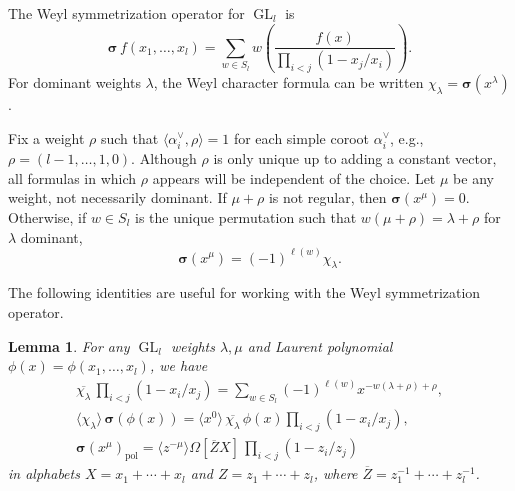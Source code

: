 \documentclass[12pt]{amsart}
\newtheorem{lemma}[thm]{Lemma}
\theoremstyle{definition}
\theoremstyle{remark}
\newcommand{\sigmabold}{{\boldsymbol \sigma }}
\DeclareMathOperator{\pol}{pol}
\DeclareMathOperator{\GL}{GL}
\newcommand{\chek}{^{\vee }}
\begin{document}
The Weyl symmetrization operator for $\GL _{l}$ is
\begin{equation}\label{e:Weyl-symmetrization}
\sigmabold \, f(x_{1},\ldots,x_{l}) = \sum _{w\in S_{l}}
w\left(\frac{f(x)}{\prod _{i<j}(1-x_{j}/x_{i})} \right).
\end{equation}
For dominant weights $\lambda$,
the Weyl character formula can be written $\chi _{\lambda } = \sigmabold
(x^{\lambda })$.

Fix a weight $\rho$ such that $\langle \alpha _{i}\chek ,\rho \rangle
= 1$ for each simple coroot $\alpha _{i}\chek $, e.g., $\rho =
(l-1,\ldots,1,0)$.  Although $\rho $ is only unique up to adding a
constant vector, all formulas in which $\rho $ appears will be
independent of the choice.  Let $\mu $ be any weight, not necessarily
dominant.  If $\mu +\rho $ is not regular, then $\sigmabold (x^{\mu }) = 0$.
Otherwise, if $w\in S_{l}$ is the unique permutation
such that $w(\mu +\rho )=\lambda +\rho $ for $\lambda $ dominant,
\begin{equation}\label{e:Weyl-general}
\sigmabold (x^{\mu }) = (-1)^{\ell(w)}\chi _{\lambda }.
\end{equation}


The following identities are useful for working with the Weyl
symmetrization operator.

\begin{lemma}\label{lem:Cauchy-Weyl}
For any $\GL _{l}$ weights $\lambda ,\mu $ and Laurent polynomial
$\phi(x)=\phi (x_{1},\ldots ,x_{l})$, we have
\begin{gather} \label{e:Cauchy-Weyl1}
\overline{\chi_\lambda}\, \prod _{i<j}(1-x_{i}/x_{j}) = \sum _{w\in
S_{l}} (-1)^{\ell(w)}x^{-w(\lambda +\rho ) +\rho },\\
 \label{e:Cauchy-Weyl2}
\langle \chi _{\lambda } \rangle \, \sigmabold(\phi (x)) = \langle
x^{0} \rangle \, \overline{ \chi _{\lambda }} \, \phi (x)\prod _{i<j}
(1-x_{i}/x_{j}),\\
\label{e:Cauchy-Weyl3}
\sigmabold (x^{\mu })_{\pol } = \langle z^{-\mu } \rangle \Omega
[\overline{Z}X] \, \prod _{i<j}(1-z_{i}/z_{j})
\end{gather}
in alphabets $X = x_{1}+\cdots + x_{l}$ and $Z = z_{1}+\cdots +z_{l}$,
where $\overline{Z} = z_{1}^{-1}+\cdots +z_{l}^{-1}$.
\end{lemma}
\end{document}
